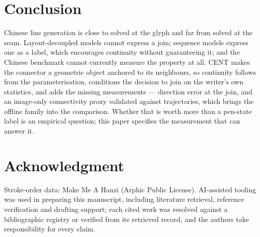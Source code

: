 \documentclass[conference]{IEEEtran}
\begin{document}
\section{Conclusion}

Chinese line generation is close to solved at the glyph and far from solved at the seam.
Layout-decoupled models cannot express a join; sequence models express one as a label, which
encourages continuity without guaranteeing it; and the Chinese benchmark cannot currently
measure the property at all. CENT makes the connector a geometric object anchored to its
neighbours, so continuity follows from the parameterisation, conditions the decision to join
on the writer's own statistics, and adds the missing measurements --- direction error at the
join, and an image-only connectivity proxy validated against trajectories, which brings the
offline family into the comparison. Whether that is worth more than a pen-state label is an
empirical question; this paper specifies the measurement that can answer it.

\section*{Acknowledgment}
Stroke-order data: Make Me A Hanzi (Arphic Public License). AI-assisted tooling was used in
preparing this manuscript, including literature retrieval, reference verification and drafting
support; each cited work was resolved against a bibliographic registry or verified from its
retrieved record, and the authors take responsibility for every claim.

\balance


\end{document}
